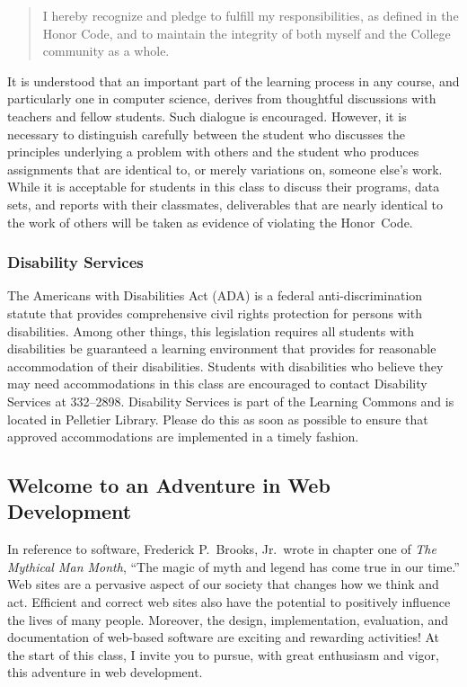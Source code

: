 \documentclass[11pt]{article}
\begin{document}
\vspace*{-.11in}
\begin{quote}
  I hereby recognize and pledge to fulfill my responsibilities, as defined in the Honor Code, and to maintain the
  integrity of both myself and the College community as a whole.
\end{quote}
\vspace*{-.11in}

\noindent It is understood that an important part of the learning process in any course, and particularly one in
computer science, derives from thoughtful discussions with teachers and fellow students. Such dialogue is encouraged.
However, it is necessary to distinguish carefully between the student who discusses the principles underlying a problem
with others and the student who produces assignments that are identical to, or merely variations on, someone else's
work. While it is acceptable for students in this class to discuss their programs, data sets, and reports with their
classmates, deliverables that are nearly identical to the work of others will be taken as evidence of violating the
\mbox{Honor Code}.

\subsubsection*{Disability Services}

The Americans with Disabilities Act (ADA) is a federal anti-discrimination statute that provides comprehensive civil
rights protection for persons with disabilities. Among other things, this legislation requires all students with
disabilities be guaranteed a learning environment that provides for reasonable accommodation of their disabilities.
Students with disabilities who believe they may need accommodations in this class are encouraged to contact Disability
Services at 332--2898. Disability Services is part of the Learning Commons and is located in Pelletier Library.
Please do this as soon as possible to ensure that approved accommodations are implemented in a timely fashion.

\subsection*{Welcome to an Adventure in Web Development}

In reference to software, Frederick P.\ Brooks, Jr.\ wrote in chapter one of {\em The Mythical Man Month}, ``The magic
of myth and legend has come true in our time.'' Web sites are a pervasive aspect of our society that changes how we
think and act. Efficient and correct web sites also have the potential to positively influence the lives of many people.
Moreover, the design, implementation, evaluation, and documentation of web-based software are exciting and rewarding
activities! At the start of this class, I invite you to pursue, with great enthusiasm and vigor, this adventure in web
development.
\end{document}
